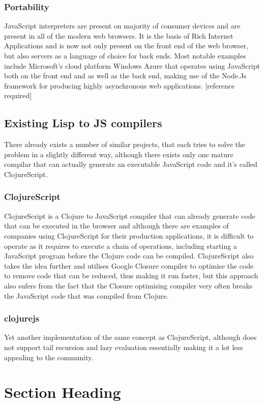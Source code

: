 \subsubsection{Portability}
JavaScript interpreters are present on majority of consumer devices and are present in all of the modern web browsers. It is the basis of Rich Internet Applications and is now not only present on the front end of the web browser, but also servers as a language of choice for back ends.
Most notable examples include Microsoft's cloud platform Windows Azure that operates using JavaScript both on the front end and as well as the back end, making use of the Node.Js framework for producing highly asynchronous web applications. [reference required]

\subsection{Existing Lisp to JS compilers}
There already exists a number of similar projects, that each tries to solve the problem in a slightly different way, although there exists only one mature compilar that can actually generate an executable JavaScript code and it's called ClojureScript.

\subsubsection{ClojureScript}
ClojureScript is a Clojure to JavaScript compiler that can already generate code that can be executed in the browser and although there are examples of companies using ClojureScript for their production applications, it is difficult to operate as it requires to execute a chain of operations, including starting a JavaScript program before the Clojure code can be compiled.
ClojureScript also takes the idea further and utilises Google Closure compiler to optimise the code to remove code that can be reduced, thus making it run faster, but this approach also sufers from the fact that the Closure optimising compiler very often breaks the JavaScript code that was compiled from Clojure.

\subsubsection{clojurejs}
Yet another implementation of the same concept as ClojureScript, although does not support tail recursion and lazy evaluation essentially making it a lot less appealing to the community.

\section{Section Heading}